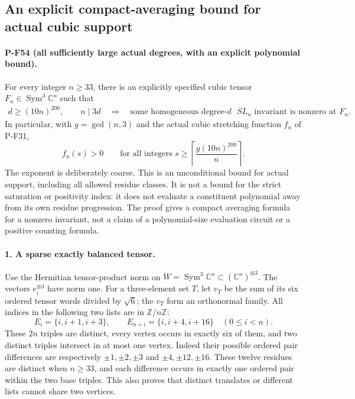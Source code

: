 \subsection{An explicit compact-averaging bound for actual cubic support}
\label{sec:cubic-reynolds-support}

\paragraph{P-F54 (all sufficiently large actual degrees, with an explicit polynomial bound).}
For every integer $n\ge33$, there is an explicitly specified
cubic tensor $F_n\in\operatorname{Sym}^3\mathbb C^n$ such that
\[
 \begin{gathered}
 d\ge(10n)^{200},\qquad n\mid3d
 \quad\Longrightarrow\quad
 \text{some homogeneous degree-$d$ $SL_n$ invariant is nonzero at }F_n.
 \end{gathered}                                                   \tag{P-F54a}
\]
In particular, with $g=\gcd(n,3)$ and the actual cubic stretching
function $f_n$ of P-F31,
\[
 f_n(s)>0\qquad\text{for all integers }s\ge
             \left\lceil\frac{g(10n)^{200}}n\right\rceil .        \tag{P-F54b}
\]
The exponent is deliberately coarse. This is an unconditional
bound for actual support, including all allowed residue classes.
It is not a bound for the strict saturation or positivity index:
it does not evaluate a constituent polynomial away from its own
residue progression. The proof gives a compact averaging formula
for a nonzero invariant, not a claim of a polynomial-size
evaluation circuit or a positive counting formula.

\paragraph{1. A sparse exactly balanced tensor.}
Use the Hermitian tensor-product norm on
$W=\operatorname{Sym}^3\mathbb C^n\subset(\mathbb C^n)^{\otimes3}$.
The vectors $e_i^{\otimes3}$ have norm one. For a three-element
set $T$, let $v_T$ be the sum of its six ordered tensor words
divided by $\sqrt6$; the $v_T$ form an orthonormal family.
All indices in the following two lists are in $\mathbb Z/n\mathbb Z$:
\[
 E_i=\{i,i+1,i+3\},\qquad E_{n+i}=\{i,i+4,i+16\}
                      \quad(0\le i<n).                         \tag{P-F54c}
\]
These $2n$ triples are distinct, every vertex occurs in exactly six
of them, and two distinct triples intersect in at most one vertex.
Indeed their possible ordered pair differences are respectively
$\pm1,\pm2,\pm3$ and $\pm4,\pm12,\pm16$. These twelve
residues are distinct when $n\ge33$, and each difference occurs
in exactly one ordered pair within the two base triples. This
also proves that distinct translates or different lists cannot
share two vertices.

